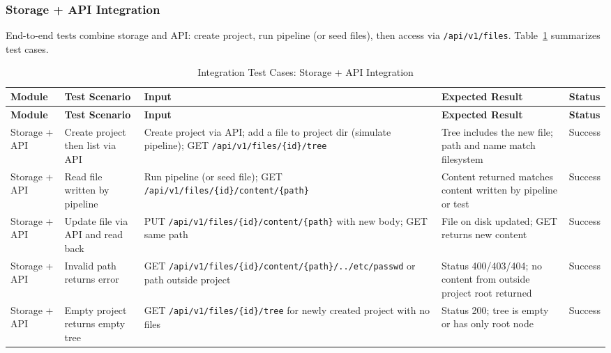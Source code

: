 \subsubsection*{Storage + API Integration}
End-to-end tests combine storage and API: create project, run pipeline (or seed files), then access via \texttt{/\allowbreak{}api/\allowbreak{}v1/\allowbreak{}files}. Table~\ref{tab:integration_storage} summarizes test cases.

\renewcommand{\arraystretch}{1.2}
\begin{longtable}{|p{2.8cm}|p{3.4cm}|p{3.4cm}|p{4.2cm}|>{\centering\arraybackslash}p{1.6cm}|}
\caption{Integration Test Cases: Storage + API Integration}
\label{tab:integration_storage}
\\
\hline
\textbf{Module} & \textbf{Test Scenario} & \textbf{Input} & \textbf{Expected Result} & \textbf{Status} \\
\hline
\endfirsthead
\hline
\textbf{Module} & \textbf{Test Scenario} & \textbf{Input} & \textbf{Expected Result} & \textbf{Status} \\
\hline
\endhead
\hline
\endfoot
\hline
\endlastfoot
Storage + API & Create project then list via API & Create project via API; add a file to project dir (simulate pipeline); GET \texttt{/\allowbreak{}api/\allowbreak{}v1/\allowbreak{}files/\allowbreak{}\{id\}/tree} & Tree includes the new file; path and name match filesystem & Success \\
\hline
Storage + API & Read file written by pipeline & Run pipeline (or seed file); GET \texttt{/\allowbreak{}api/\allowbreak{}v1/\allowbreak{}files/\allowbreak{}\{id\}/content/\allowbreak{}\{path\}} & Content returned matches content written by pipeline or test & Success \\
\hline
Storage + API & Update file via API and read back & PUT \texttt{/\allowbreak{}api/\allowbreak{}v1/\allowbreak{}files/\allowbreak{}\{id\}/content/\allowbreak{}\{path\}} with new body; GET same path & File on disk updated; GET returns new content & Success \\
\hline
Storage + API & Invalid path returns error & GET \texttt{/\allowbreak{}api/\allowbreak{}v1/\allowbreak{}files/\allowbreak{}\{id\}/content/\allowbreak{}\{path\}/../etc/\allowbreak{}passwd} or path outside project & Status 400/403/404; no content from outside project root returned & Success \\
\hline
Storage + API & Empty project returns empty tree & GET \texttt{/\allowbreak{}api/\allowbreak{}v1/\allowbreak{}files/\allowbreak{}\{id\}/tree} for newly created project with no files & Status 200; tree is empty or has only root node & Success \\
\hline
\end{longtable}

